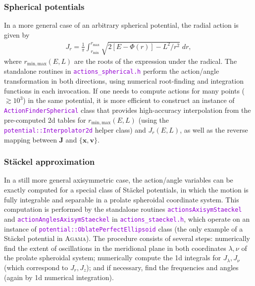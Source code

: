 \documentclass[12pt]{article}
\newcommand{\Agama}{\textsc{Agama}\xspace}
\newcommand{\ttt}[1]{\textcolor{darkviolet}{\texttt{#1}}}
\newcommand{\bv}{\boldsymbol{v}}
\newcommand{\bx}{\boldsymbol{x}}
\newcommand{\bJ}{\boldsymbol{J}}
\begin{document}
\subsubsection{Spherical potentials}  \label{sec:ActionsSpherical}

In a more general case of an arbitrary spherical potential, the radial action is given by 
\begin{align*}
J_r = \frac{1}{\pi} \int_{r_\mathrm{min}}^{r_\mathrm{max}} \sqrt{2[E-\Phi(r)] - L^2/r^2}\;dr,
\end{align*}
where $r_\mathrm{min,max}(E,L)$ are the roots of the expression under the radical.
The standalone routines in \ttt{actions_spherical.h} perform the action/angle transformation in both directions, using numerical root-finding and integration functions in each invocation. If one needs to compute actions for many points ($\gtrsim 10^3$) in the same potential, it is more efficient to construct an instance of \ttt{ActionFinderSpherical} class that provides high-accuracy interpolation from the pre-computed 2d tables for $r_\mathrm{min,max}(E,L)$ (using the \ttt{potential::Interpolator2d} helper class) and $J_r(E,L)$, as well as the reverse mapping between $\bJ$ and $\{\bx,\bv\}$.

\subsubsection{St\"ackel approximation}  \label{sec:ActionsStaeckel}

In a still more general axisymmetric case, the action/angle variables can be exactly computed for a special class of St\"ackel potentials, in which the motion is fully integrable and separable in a prolate spheroidal coordinate system. This computation is performed by the standalone routines \ttt{actionsAxisymStaeckel} and \ttt{actionAnglesAxisymStaeckel} in \ttt{actions_staeckel.h}, which operate on an instance of \ttt{potential::OblatePerfectEllipsoid} class (the only example of a St\"ackel potential in \Agama). The procedure consists of several steps: numerically find the extent of oscillations in the meridional plane in both coordinates $\lambda, \nu$ of the prolate spheroidal system; numerically compute the 1d integrals for $J_\lambda, J_\nu$ (which correspond to $J_r, J_z$); and if necessary, find the frequencies and angles (again by 1d numerical integration).
\end{document}

